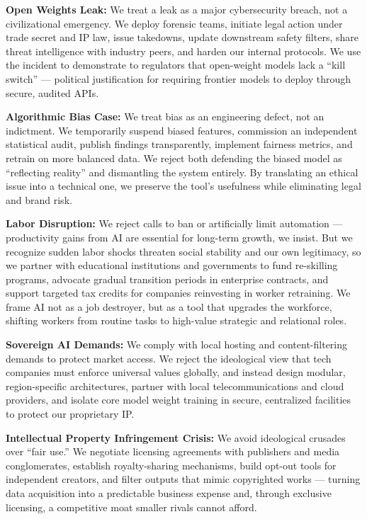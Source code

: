 \textbf{Open Weights Leak:} We treat a leak as a major cybersecurity
breach, not a civilizational emergency. We deploy forensic teams,
initiate legal action under trade secret and IP law, issue takedowns,
update downstream safety filters, share threat intelligence with
industry peers, and harden our internal protocols. We use the incident
to demonstrate to regulators that open-weight models lack a ``kill
switch'' --- political justification for requiring frontier models to
deploy through secure, audited APIs.

\textbf{Algorithmic Bias Case:} We treat bias as an engineering defect,
not an indictment. We temporarily suspend biased features, commission an
independent statistical audit, publish findings transparently, implement
fairness metrics, and retrain on more balanced data. We reject both
defending the biased model as ``reflecting reality'' and dismantling the
system entirely. By translating an ethical issue into a technical one,
we preserve the tool's usefulness while eliminating legal and brand
risk.

\textbf{Labor Disruption:} We reject calls to ban or artificially limit
automation --- productivity gains from AI are essential for long-term
growth, we insist. But we recognize sudden labor shocks threaten social
stability and our own legitimacy, so we partner with educational
institutions and governments to fund re-skilling programs, advocate
gradual transition periods in enterprise contracts, and support targeted
tax credits for companies reinvesting in worker retraining. We frame AI
not as a job destroyer, but as a tool that upgrades the workforce,
shifting workers from routine tasks to high-value strategic and
relational roles.

\textbf{Sovereign AI Demands:} We comply with local hosting and
content-filtering demands to protect market access. We reject the
ideological view that tech companies must enforce universal values
globally, and instead design modular, region-specific architectures,
partner with local telecommunications and cloud providers, and isolate
core model weight training in secure, centralized facilities to protect
our proprietary IP.

\textbf{Intellectual Property Infringement Crisis:} We avoid ideological
crusades over ``fair use.'' We negotiate licensing agreements with
publishers and media conglomerates, establish royalty-sharing
mechanisms, build opt-out tools for independent creators, and filter
outputs that mimic copyrighted works --- turning data acquisition into a
predictable business expense and, through exclusive licensing, a
competitive moat smaller rivals cannot afford.

